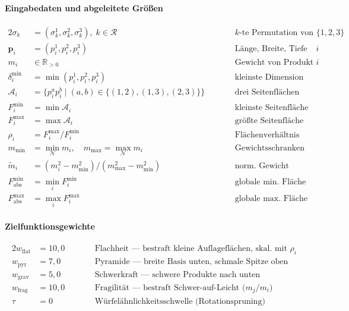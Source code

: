 \documentclass[10pt]{article}
\newcommand{\NN}{\mathcal{N}}
\newcommand{\R}{\mathcal{R}}
\begin{document}
\paragraph{Eingabedaten und abgeleitete Gr\"o\ss en}
\begin{alignat*}{2}
\sigma_k &= (\sigma_k^1, \sigma_k^2, \sigma_k^3),\; k \in \R
  && \text{$k$-te Permutation von $\{1,2,3\}$} \\
\mathbf{p}_i &= (p_i^1, p_i^2, p_i^3)
  &\qquad& \text{L\"ange, Breite, Tiefe von Produkt $i$} \\
m_i &\in \mathbb{R}_{>0}
  && \text{Gewicht von Produkt $i$} \\
\delta_i^{\min} &= \min(p_i^1, p_i^2, p_i^3)
  &\qquad& \text{kleinste Dimension} \\
\mathcal{A}_i &= \bigl\{ p_i^a p_i^b \mid (a,b) \in \{(1,2),(1,3),(2,3)\} \bigr\}
  && \text{drei Seitenfl\"achen} \\
F_i^{\min} &= \min \mathcal{A}_i
  && \text{kleinste Seitenfl\"ache} \\
F_i^{\max} &= \max \mathcal{A}_i
  && \text{gr\"o\ss te Seitenfl\"ache} \\
\rho_i &= F_i^{\max} / F_i^{\min}
  && \text{Fl\"achenverh\"altnis} \\
m_{\min} &= \min_\NN m_i, \quad m_{\max} = \max_\NN m_i
  && \text{Gewichtsschranken} \\
\tilde{m}_i &= (m_i^2 - m_{\min}^2) / (m_{\max}^2 - m_{\min}^2)
  && \text{norm.\ Gewicht (quadr.\ Skalierung)} \\
F_{\mathrm{abs}}^{\min} &= \min_i F_i^{\min}
  && \text{globale min.\ Fl\"ache} \\
F_{\mathrm{abs}}^{\max} &= \max_i F_i^{\max}
  && \text{globale max.\ Fl\"ache}
\end{alignat*}

\paragraph{Zielfunktionsgewichte}
\begin{alignat*}{2}
w_{\mathrm{flat}} &= 10{,}0
  &\qquad& \text{Flachheit --- bestraft kleine Auflagefl\"achen, skal.\ mit $\rho_i$} \\
w_{\mathrm{pyr}} &= 7{,}0
  && \text{Pyramide --- breite Basis unten, schmale Spitze oben} \\
w_{\mathrm{grav}} &= 5{,}0
  && \text{Schwerkraft --- schwere Produkte nach unten} \\
w_{\mathrm{frag}} &= 10{,}0
  && \text{Fragilit\"at --- bestraft Schwer-auf-Leicht ($m_j/m_i$)} \\
\tau &= 0
  && \text{W\"urfel\"ahnlichkeitsschwelle (Rotationspruning)}
\end{alignat*}
\end{document}
